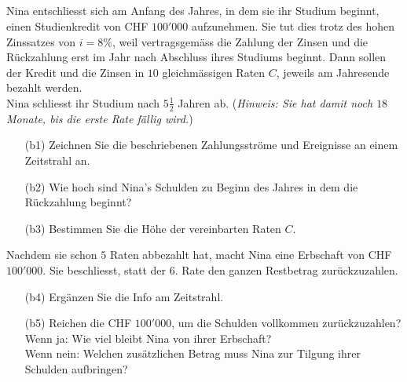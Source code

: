 \subsection*{}
Nina entschliesst sich am Anfang des Jahres, in dem sie ihr Studium beginnt, einen Studienkredit
von CHF $ 100'000 $ aufzunehmen. Sie tut dies trotz des hohen Zinssatzes von $ i = 8 \% $, weil
vertragsgemäss die Zahlung der Zinsen und die Rückzahlung erst im Jahr nach Abschluss ihres
Studiums beginnt.
Dann sollen der Kredit und die Zinsen in $ 10  $ gleichmässigen Raten $ C $, jeweils am Jahresende bezahlt werden.\\
Nina schliesst ihr Studium nach $ 5\frac{1}{2} $ Jahren ab. (\textit{Hinweis: Sie hat damit noch $ 18  $ Monate, bis die erste Rate fällig wird.})
\begin{enumerate}
	\item[(b1)]
	Zeichnen Sie die beschriebenen Zahlungsströme und Ereignisse an einem Zeitstrahl an.
	\item[(b2)] 
	Wie hoch sind Nina's Schulden zu Beginn des Jahres in dem die Rückzahlung beginnt?
	\item[(b3)] 
	Bestimmen Sie die Höhe der vereinbarten Raten $ C $.
\end{enumerate}
Nachdem sie schon $ 5 $ Raten abbezahlt hat, macht Nina eine Erbschaft von CHF $ 100'000 $.
Sie beschliesst, statt der $ 6. $ Rate den ganzen Restbetrag zurückzuzahlen.
\begin{enumerate}
	\item[(b4)] 
	Ergänzen Sie die Info am Zeitstrahl.
	\item[(b5)] 
	Reichen die CHF $ 100'000 $, um die Schulden vollkommen zurückzuzahlen?\\
	Wenn ja: Wie viel bleibt Nina von ihrer Erbschaft?\\
	Wenn nein: Welchen zusätzlichen Betrag muss Nina zur Tilgung ihrer Schulden aufbringen?
\end{enumerate}
\ \\

